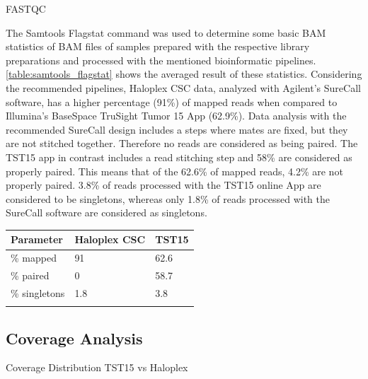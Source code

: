 FASTQC


\begin{minipage}{0.5\textwidth}
The Samtools Flagstat command was used to determine some basic BAM statistics of BAM
files of samples prepared with the respective library preparations and processed with
the mentioned bioinformatic pipelines. \ref{table:samtools_flagstat} shows the
averaged result of these statistics. Considering the recommended pipelines, Haloplex
CSC data, analyzed with Agilent's SureCall software, has a higher percentage (91\%) of mapped
reads when compared to Illumina's BaseSpace TruSight Tumor 15 App (62.9\%). Data analysis
with the recommended SureCall design includes a steps where mates are fixed, but they
are not stitched together. Therefore no reads are considered as being paired. The TST15 app
in contrast includes a read stitching step and 58\% are considered as properly paired.
This means that of the 62.6\% of mapped reads, 4.2\% are not properly paired. 3.8\%
of reads processed with the TST15 online App are considered to be singletons, whereas
only 1.8\% of reads processed with the SureCall software are considered as singletons.
\end{minipage}
\hfill
\begin{minipage}{0.5\textwidth}
\begin{tabular}{p{3cm} p{1.5cm} p{1.5cm}}\\
\hline
Parameter & Haloplex CSC & TST15 \\
\hline
\% mapped & 91 & 62.6 \\
\% paired & 0 & 58.7 \\
\% singletons & 1.8 & 3.8 \\
\label{samtools_flagstat}
\end{tabular}
\end{minipage}

\subsection{Coverage Analysis}

Coverage Distribution TST15 vs Haloplex

